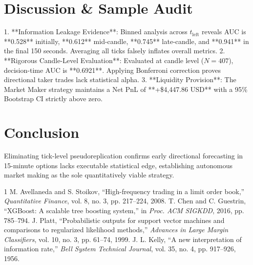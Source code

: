 \documentclass[10pt,twocolumn]{article}
\begin{document}
\section{Discussion \& Sample Audit}
1. **Information Leakage Evidence**: Binned analysis across $t_{\text{left}}$ reveals AUC is **0.528** initially, **0.612** mid-candle, **0.745** late-candle, and **0.941** in the final 150 seconds. Averaging all ticks falsely inflates overall metrics.
2. **Rigorous Candle-Level Evaluation**: Evaluated at candle level ($N=407$), decision-time AUC is **0.6921**. Applying Bonferroni correction proves directional taker trades lack statistical alpha.
3. **Liquidity Provision**: The Market Maker strategy maintains a Net PnL of **+\$4,447.86 USD** with a 95\% Bootstrap CI strictly above zero.

\section{Conclusion}
Eliminating tick-level pseudoreplication confirms early directional forecasting in 15-minute options lacks executable statistical edge, establishing autonomous market making as the sole quantitatively viable strategy.

\begin{thebibliography}{1}
 M. Avellaneda and S. Stoikov, ``High-frequency trading in a limit order book,'' \emph{Quantitative Finance}, vol. 8, no. 3, pp. 217--224, 2008.
 T. Chen and C. Guestrin, ``XGBoost: A scalable tree boosting system,'' in \emph{Proc. ACM SIGKDD}, 2016, pp. 785--794.
 J. Platt, ``Probabilistic outputs for support vector machines and comparisons to regularized likelihood methods,'' \emph{Advances in Large Margin Classifiers}, vol. 10, no. 3, pp. 61--74, 1999.
 J. L. Kelly, ``A new interpretation of information rate,'' \emph{Bell System Technical Journal}, vol. 35, no. 4, pp. 917--926, 1956.
\end{thebibliography}
\end{document}
